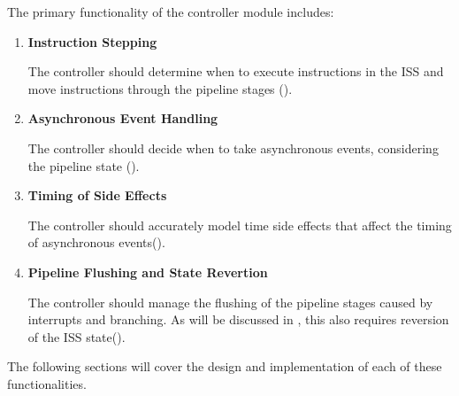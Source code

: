 The primary functionality of the controller module includes:
\begin{enumerate}
    \item \textbf{Instruction Stepping} 
    \par The controller should determine when to execute instructions in the ISS and move instructions through the pipeline stages ().
    
    \item \textbf{Asynchronous Event Handling}
    \par The controller should decide when to take asynchronous events, considering the pipeline state ().

    \item \textbf{Timing of Side Effects} 
    \par The controller should accurately model time side effects that affect the timing of asynchronous events().
    
    \item \textbf{Pipeline Flushing and State Revertion}
    \par The controller should manage the flushing of the pipeline stages caused by interrupts and branching. As will be discussed in , this also requires reversion of the ISS state().
\end{enumerate}

The following sections will cover the design and implementation of each of these functionalities. 

%

